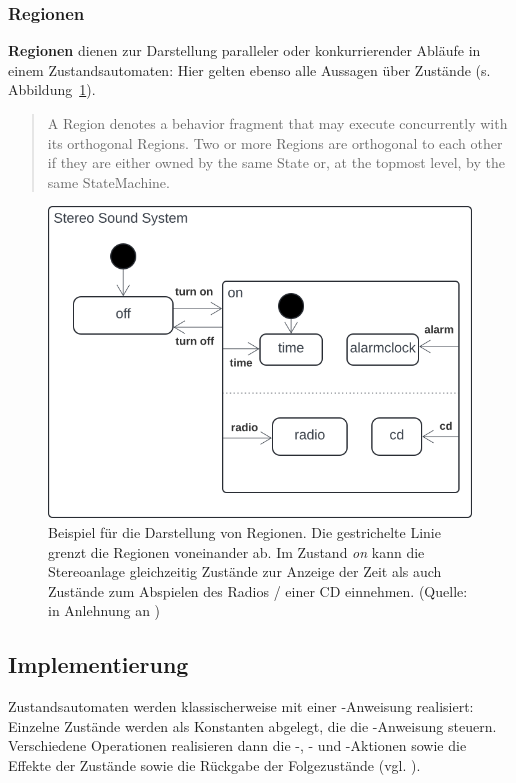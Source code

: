 \subsubsection*{Regionen}
\textbf{Regionen} dienen zur Darstellung paralleler oder konkurrierender Abläufe in einem Zustandsautomaten: Hier gelten ebenso alle Aussagen über Zustände (s. Abbildung~\ref{fig:region}).\\

\blockquote[{\cite[307]{OMG17}}]{
    A Region denotes a behavior fragment that may execute concurrently with its orthogonal Regions. Two or more
    Regions are orthogonal to each other if they are either owned by the same State or, at the topmost level, by the same
    StateMachine.
}

\begin{figure}
    \centering
    \includegraphics[scale=0.4]{part three/Zustandsautomaten/img/region}
    \caption{Beispiel für die Darstellung von Regionen. Die gestrichelte Linie grenzt die Regionen voneinander ab. Im Zustand \textit{on} kann die Stereoanlage gleichzeitig  Zustände zur Anzeige der Zeit als auch Zustände zum Abspielen des Radios / einer CD einnehmen. (Quelle: in Anlehnung an \cite[74, Abb. 7.9]{Buh09})}
    \label{fig:region}
\end{figure}


\subsection{Implementierung}
Zustandsautomaten werden klassischerweise mit einer -Anweisung realisiert: Einzelne Zustände werden als Konstanten abgelegt, die die -Anweisung steuern.\\
Verschiedene Operationen realisieren dann die -, - und -Aktionen sowie die Effekte der Zustände sowie die Rückgabe der Folgezustände (vgl. \cite[75]{Buh09}).